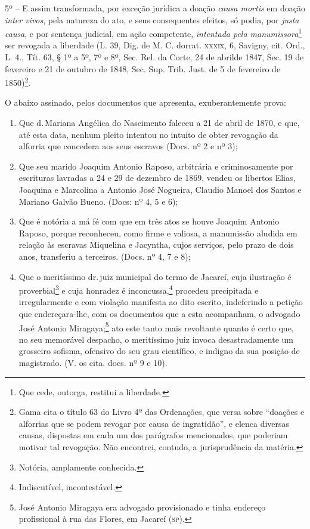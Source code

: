 5º -- E assim transformada, por exceção jurídica a doação \emph{causa
mortis} em doação \emph{inter vivos}, pela natureza do ato, e seus
consequentes efeitos, só podia, por \emph{justa causa}, e por sentença
judicial, em ação competente, \emph{intentada pela
manumissora}\footnote{ Que cede, outorga, restitui a liberdade.} ser
revogada a liberdade (L. 39, Dig. de M. C. dorrat. \textsc{xxxix}, 6, Savigny,
cit. Ord., L. 4., Tít. 63, § 1º a 5º, 7º e 8º, Sec. Rel. da Corte, 24 de
abrilde 1847, Sec. 19 de fevereiro e 21 de outubro de 1848, Sec. Sup.
Trib. Just. de 5 de fevereiro de 1850)\footnote{ Gama cita o título 63
  do Livro 4º das Ordenações, que versa sobre ``doações e alforrias
  que se podem revogar por causa de ingratidão'', e elenca diversas
  causas, dispostas em cada um dos parágrafos mencionados, que poderiam
  motivar tal revogação. Não encontrei, contudo, a jurisprudência da
  matéria.}.

O abaixo assinado, pelos documentos que apresenta, exuberantemente
prova:

\begin{enumerate}[label=\arabic*º]
\item Que d.\,Mariana Angélica do Nascimento faleceu a 21 de abril de
1870, e que, até esta data, nenhum pleito intentou no intuito de obter
revogação da alforria que concedera aos seus escravos (Docs. nº 2 e nº
3);

\item Que seu marido Joaquim Antonio Raposo, arbitrária e criminosamente
por escrituras lavradas a 24 e 29 de dezembro de 1869, vendeu os
libertos Elias, Joaquina e Marcolina a Antonio José Nogueira, Claudio
Manoel dos Santos e Mariano Galvão Bueno. (Docs: nº 4, 5 e 6);

\item Que é notória a má fé com que em três atos se houve Joaquim
Antonio Raposo, porque reconheceu, como firme e valiosa, a manumissão
aludida em relação às escravas Miquelina e Jacyntha, cujos serviços,
pelo prazo de dois anos, transferiu a terceiros. (Docs. nº 4, 7 e 8);

\item Que o meritíssimo dr.\,juiz municipal do termo de Jacareí, cuja
ilustração é proverbial\footnote{ Notória, amplamente conhecida.} e
cuja honradez é inconcussa,\footnote{ Indiscutível, incontestável.}
procedeu precipitada e irregularmente e com violação manifesta ao dito
escrito, indeferindo a petição que endereçara-lhe, com os documentos que
a esta acompanham, o advogado José Antonio Miragaya;\footnote{ José
  Antonio Miragaya era advogado provisionado e tinha endereço
  profissional à rua das Flores, em Jacareí (\textsc{sp}).} ato este tanto mais
revoltante quanto é certo que, no seu memorável despacho, o meritíssimo
juiz invoca desastradamente um grosseiro sofisma, ofensivo do seu grau
científico, e indigno da sua posição de magistrado. (V. os cita. docs.
nº 9 e 10).
\end{enumerate}

